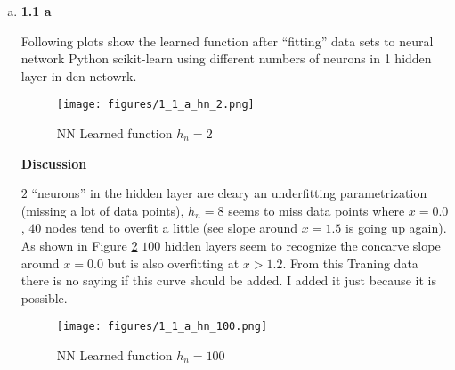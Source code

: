 \documentclass[12pt,a4paper]{article}
\begin{document}
\begin{enumerate}[a)]
  
  
  \item \textbf{1.1 a}
  
Following plots show the learned function after ``fitting'' data sets to neural
network Python scikit-learn\autocite{scikit} using different numbers of neurons
in 1 hidden layer in den netowrk.
  
\begin{figure}[H]
	\centering
  \texttt{[image: figures/1\_1\_a\_hn\_2.png]}
	\caption{NN Learned function $h_n=2$}
	\label{1_1_a_hn_2}
\end{figure}

\textbf{Discussion}

$2$ ``neurons'' in the hidden layer are cleary an underfitting parametrization
(missing a lot of data points), $h_n = 8$ seems to miss data points where $ x =
0.0$, $40$ nodes tend to overfit a little (see slope around $x = 1.5$ is going
up again). As shown in Figure \ref{1_1_a_hn_100} $100$ hidden layers seem to
recognize the concarve slope around $x = 0.0$ but is also overfitting at $x >
1.2$. From this Traning data there is no saying if this curve should be added. I
added it just because it is possible.

\begin{figure}[H]
	\centering
  \texttt{[image: figures/1\_1\_a\_hn\_100.png]}
	\caption{NN Learned function $h_n=100$}
	\label{1_1_a_hn_100}
\end{figure}

\end{enumerate}

\newpage
\printbibliography
\end{document}

